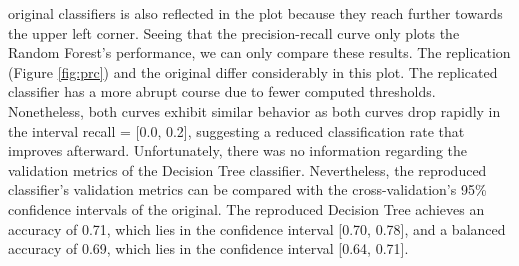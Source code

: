 original classifiers is also reflected in the plot because they reach further 
towards the upper left corner. Seeing that the precision-recall curve only 
plots the 
Random Forest's performance, we can only compare these results. The replication 
(Figure \ref{fig:prc}) and the original differ considerably in this plot. The 
replicated classifier has a more abrupt course due to fewer 
computed thresholds. Nonetheless, both curves exhibit similar behavior as both 
curves drop rapidly in the interval recall = [0.0, 0.2], suggesting a reduced 
classification rate that improves afterward. Unfortunately, there was no 
information regarding the validation metrics of the Decision Tree classifier. 
Nevertheless,  the reproduced classifier's validation metrics can be compared 
with the cross-validation's 95\% confidence intervals of the original. The 
reproduced Decision Tree achieves an accuracy of 0.71, which lies in the 
confidence interval [0.70, 0.78], and a balanced accuracy of 0.69, which lies 
in the confidence interval [0.64, 0.71].
